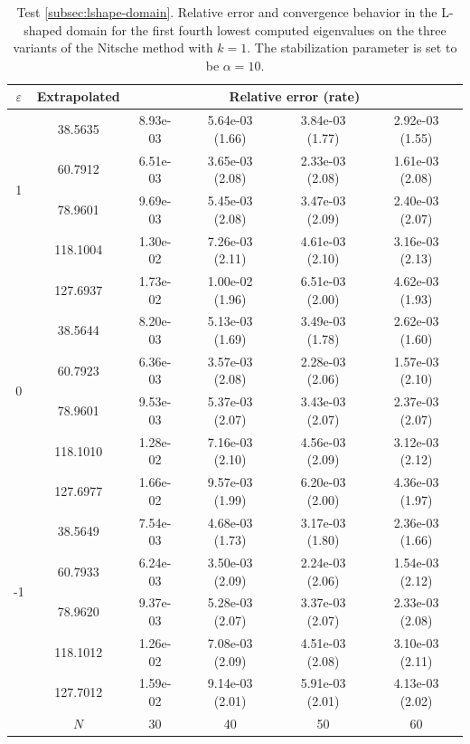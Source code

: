 \documentclass[onefignum,onetabnum,final]{siamart250211}
\numberwithin{equation}{section}
\newcommand\0{\boldsymbol{0}}
\begin{document}
	\begin{table}[!hbt]
		\centering
		{\setlength{\tabcolsep}{3.8pt}\footnotesize
			\caption{Test \ref{subsec:lshape-domain}. Relative error and convergence behavior in the L-shaped domain for the first fourth lowest computed eigenvalues on the three variants of the Nitsche method with $k=1$. The stabilization parameter is set to be $\alpha=10$.}
			\label{tabla:lshape-convergence-k1}
			\begin{tabular}{|c|c|cccc|}
				\hline
				$\varepsilon$& Extrapolated & \multicolumn{4}{c|}{Relative error (rate)} \\
				\hline
				\multirow{4}{0.02\linewidth}{1}&   38.5635 &   8.93e-03  &   5.64e-03 (1.66) &   3.84e-03 (1.77) &   2.92e-03 (1.55)   \\
				&   60.7912 &   6.51e-03  &   3.65e-03 (2.08) &   2.33e-03 (2.08) &   1.61e-03 (2.08)   \\
				&   78.9601 &   9.69e-03  &   5.45e-03 (2.08) &   3.47e-03 (2.09) &   2.40e-03 (2.07)   \\
				&  118.1004 &   1.30e-02  &   7.26e-03 (2.11) &   4.61e-03 (2.10) &   3.16e-03 (2.13)   \\
				&  127.6937 &   1.73e-02  &   1.00e-02 (1.96) &   6.51e-03 (2.00) &   4.62e-03 (1.93)   \\
				\hline
				\multirow{4}{0.02\linewidth}{0}&   38.5644 &   8.20e-03  &   5.13e-03 (1.69) &   3.49e-03 (1.78) &   2.62e-03 (1.60)   \\
				&   60.7923 &   6.36e-03  &   3.57e-03 (2.08) &   2.28e-03 (2.06) &   1.57e-03 (2.10)   \\
				&   78.9601 &   9.53e-03  &   5.37e-03 (2.07) &   3.43e-03 (2.07) &   2.37e-03 (2.07)   \\
				&  118.1010 &   1.28e-02  &   7.16e-03 (2.10) &   4.56e-03 (2.09) &   3.12e-03 (2.12)   \\
				&  127.6977 &   1.66e-02  &   9.57e-03 (1.99) &   6.20e-03 (2.00) &   4.36e-03 (1.97)   \\
				\hline
				\multirow{4}{0.02\linewidth}{-1}&   38.5649 &   7.54e-03  &   4.68e-03 (1.73) &   3.17e-03 (1.80) &   2.36e-03 (1.66)   \\
				&   60.7933 &   6.24e-03  &   3.50e-03 (2.09) &   2.24e-03 (2.06) &   1.54e-03 (2.12)   \\
				&   78.9620 &   9.37e-03  &   5.28e-03 (2.07) &   3.37e-03 (2.07) &   2.33e-03 (2.08)   \\
				&  118.1012 &   1.26e-02  &   7.08e-03 (2.09) &   4.51e-03 (2.08) &   3.10e-03 (2.11)   \\
				&  127.7012 &   1.59e-02  &   9.14e-03 (2.01) &   5.91e-03 (2.01) &   4.13e-03 (2.02)   \\
				\hline
				&$N$&30&40&50 &60\\
				\hline
				\hline
		\end{tabular}}
	\end{table}
	
\end{document}
